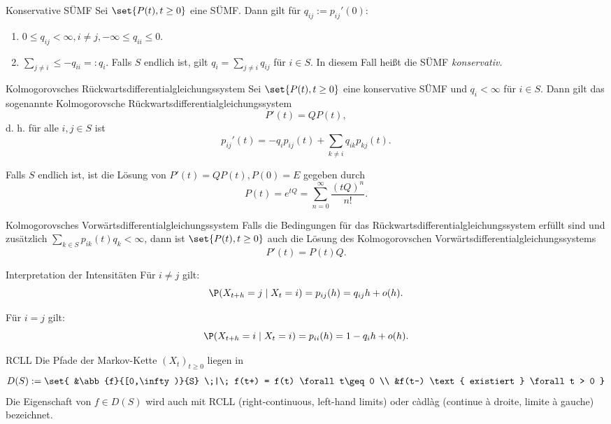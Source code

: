 \begin{karte}{Konservative SÜMF}
    Sei \(\set{P(t), t\geq 0}\) eine SÜMF. Dann gilt für \(q_{ij} := p_{ij}'(0)\):
    \begin{enumerate}
        \item \( 0\leq q_{ij} < \infty, i\neq j, -\infty \leq q_{ii} \leq 0 \).
        \item \( \sum_{j\neq i} \leq -q_{ii} =: q_i \). 
        Falls \(S\) endlich ist, gilt \(q_i = \sum_{j\neq i} q_{ij}\) 
        für \(i\in S\). In diesem Fall heißt die SÜMF \textit{konservativ}.
    \end{enumerate}
\end{karte}

\begin{karte}{Kolmogorovsches Rückwartsdifferentialgleichungssystem}
    Sei \( \set{P(t), t \geq 0} \) eine konservative SÜMF und \(q_i < \infty \) 
    für \(i\in S\). Dann gilt das sogenannte Kolmogorovsche 
    Rückwartsdifferentialgleichungssystem
    \[ P'(t) = Q P(t), \]
    d. h. für alle \(i,j\in S\) ist 
    \[ p_{ij}'(t) = -q_i p_{ij}(t) + \sum_{k\neq i} q_{ik} p_{kj}(t). \]

    Falls \(S\) endlich ist, ist die Lösung von \(P'(t) = Q P(t), P(0) = E\) gegeben durch 
    \[ P(t) = e^{tQ} = \sum_{n=0}^\infty \frac{(tQ)^n}{n!}. \]
\end{karte}

\begin{karte}{Kolmogorovsches Vorwärtsdifferentialgleichungssystem}
    Falls die Bedingungen für das Rückwartsdifferentialgleichungssystem 
    erfüllt sind und zusätzlich \(\sum_{k\in S} p_{ik}(t) q_k < \infty \),
    dann ist \( \set{P(t), t\geq 0} \) auch die Lösung des Kolmogorovschen
    Vorwärtsdifferentialgleichungssystems
    \[ P'(t) = P(t) Q. \]
\end{karte}

\begin{karte}{Interpretation der Intensitäten}
    Für \(i\neq j\) gilt:
    \[ \P(X_{t+h} = j \;|\; X_t = i) = p_{ij}(h) = q_{ij}h + o(h). \]

    Für \(i=j\) gilt:
    \[ \P(X_{t+h} = i \;|\; X_t = i) = p_{ii}(h) = 1 - q_i h + o(h). \]
\end{karte}

\begin{karte}{RCLL}
    Die Pfade der Markov-Kette \((X_t)_{t\geq 0}\) liegen in 
    \begin{align*}
        D(S) := \set{ &\abb{f}{[0,\infty)}{S} \;|\; f(t+) = f(t) \forall t\geq 0 \\
        &f(t-) \text{ existiert } \forall t > 0 }
    \end{align*}
    Die Eigenschaft von \(f \in D(S)\) wird auch mit RCLL (right-continuous, left-hand limits) 
    oder càdlàg (continue à droite, limite à gauche) bezeichnet.
\end{karte}

